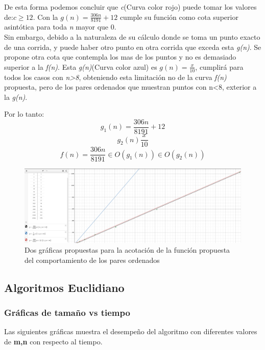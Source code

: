\documentclass{report}
\begin{document}
        De esta forma podemos concluir que \textit{c}(Curva color rojo) puede tomar los valores de:$c\geq 12$. Con la $g(n)=\frac{306n}{8191}+12$ cumple su función como cota superior asintótica para toda \textit{n} mayor que 0.\\
        
        Sin embargo, debido a la naturaleza de su cálculo donde se toma un punto exacto de una corrida, y puede haber otro punto en otra corrida que exceda esta \textit{g(n)}. Se propone otra cota que contempla los mas de los puntos y no es demasiado superior a la \textit{f(n)}. Esta \textit{g(n)}(Curva color azul) es $g(n)=\frac{x}{10}$, cumplirá para todos los casos con \textit{n>8}, obteniendo esta limitación no de la curva \textit{f(n)} propuesta, pero de los pares ordenados que muestran puntos con n<8, exterior a la \textit{g(n)}.
        
        
        \begin{landscape}
        Por lo tanto:
            $$g_1(n)=\frac{306n}{8191}+12$$
            $$g_2(n)\frac{x}{10}$$
            $$f(n)=\frac{306n}{8191} \in O(g_1(n)) \in O(g_2(n))$$
            \hfill \break
            \hfill \break
            \hfill \break
            \begin{figure}[!h]
            	\centering
            	\includegraphics[width=25cm]{Imagenes/Acotaciones-SumaBinaria.png}
                \caption{Dos gráficas propuestas para la acotación de la función propuesta del comportamiento de los pares ordenados}
            \end{figure}
        \end{landscape}
        
       
            
    \subsection*{Algoritmos Euclidiano}
        \subsubsection*{Gráficas de tamaño vs tiempo} 
            Las siguientes gráficas muestra el desempeño del algoritmo con diferentes valores de \textbf{m,n} con respecto al tiempo.\\
            
\end{document}
